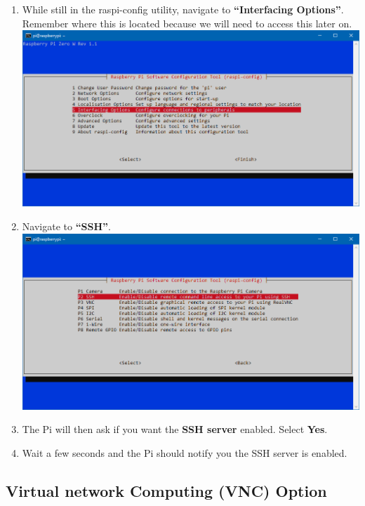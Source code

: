 \documentclass{article}
\begin{document}
\begin{enumerate}
  \item While still in the raspi-config utility, navigate to \textbf{``Interfacing Options''}. Remember where this is located because we will need to access this later on.
  \newline
  \newline
  \includegraphics[width=1.00\textwidth]{rcifoptions}
  \item Navigate to \textbf{``SSH''}.
  \newline
  \newline
  \includegraphics[width=1.00\textwidth]{rcssh}
  \item The Pi will then ask if you want the \textbf{SSH server} enabled. Select \textbf{Yes}.
  \item Wait a few seconds and the Pi should notify you the SSH server is enabled.
\end{enumerate}

\subsection{Virtual network Computing (VNC) Option}
\end{document}
